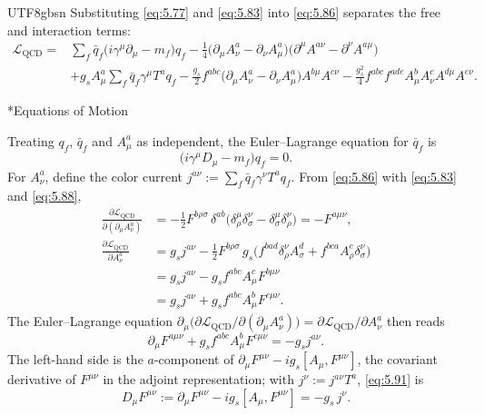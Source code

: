 \documentclass[11pt,a4paper,oneside]{report}
\makeatletter
\newcommand\topic{\@startsection{paragraph}{4}{\z@}{-1.7ex plus -.3ex}{.5ex}{\normalfont\normalsize\bfseries\itshape\boldmath}*}
\makeatother
\begin{document}
\begin{CJK*}{UTF8}{gbsn}
Substituting \eqref{eq:5.77} and \eqref{eq:5.83} into \eqref{eq:5.86} separates the free and interaction terms:
\begin{equation*}
\begin{aligned}
\mathcal L_{\mathrm{QCD}}
={}&\sum_f\bar q_f\bigl(i\gamma^\mu\partial_\mu-m_f\bigr)q_f
-\frac14\bigl(\partial_\mu A^a_\nu-\partial_\nu A^a_\mu\bigr)\bigl(\partial^\mu A^{a\nu}-\partial^\nu A^{a\mu}\bigr)\\[6pt]
&+g_sA^a_\mu\sum_f\bar q_f\gamma^\mu T^aq_f
-\frac{g_s}{2}f^{abc}\bigl(\partial_\mu A^a_\nu-\partial_\nu A^a_\mu\bigr)A^{b\mu}A^{c\nu}
-\frac{g_s^2}{4}f^{abc}f^{ade}A^b_\mu A^c_\nu A^{d\mu}A^{e\nu}.
\end{aligned}
\tag{5.88}\label{eq:5.88}
\end{equation*}

\topic{Equations of Motion}

Treating $q_f$, $\bar q_f$ and $A^a_\mu$ as independent, the Euler–Lagrange equation for $\bar q_f$ is
\begin{equation*}
\bigl(i\gamma^\mu D_\mu-m_f\bigr)q_f=0.
\tag{5.89}\label{eq:5.89}
\end{equation*}
For $A^a_\nu$, define the color current $j^{a\nu}:=\sum_f\bar q_f\gamma^\nu T^aq_f$. From \eqref{eq:5.86} with \eqref{eq:5.83} and \eqref{eq:5.88},
\begin{equation*}
\begin{aligned}
\frac{\partial\mathcal L_{\mathrm{QCD}}}{\partial(\partial_\mu A^a_\nu)}
&=-\frac12F^{b\rho\sigma}\,\delta^{ab}\bigl(\delta^\mu_\rho\delta^\nu_\sigma-\delta^\mu_\sigma\delta^\nu_\rho\bigr)
=-F^{a\mu\nu},\\[6pt]
\frac{\partial\mathcal L_{\mathrm{QCD}}}{\partial A^a_\nu}
&=g_sj^{a\nu}-\frac12F^{b\rho\sigma}\,g_s\bigl(f^{bad}\delta^\nu_\rho A^d_\sigma+f^{bca}A^c_\rho\delta^\nu_\sigma\bigr)\\
&=g_sj^{a\nu}-g_sf^{abc}A^c_\mu F^{b\mu\nu}\\
&=g_sj^{a\nu}+g_sf^{abc}A^b_\mu F^{c\mu\nu}.
\end{aligned}
\tag{5.90}\label{eq:5.90}
\end{equation*}
The Euler–Lagrange equation $\partial_\mu\bigl(\partial\mathcal L_{\mathrm{QCD}}/\partial(\partial_\mu A^a_\nu)\bigr)=\partial\mathcal L_{\mathrm{QCD}}/\partial A^a_\nu$ then reads
\begin{equation*}
{\displaystyle 
\partial_\mu F^{a\mu\nu}+g_sf^{abc}A^b_\mu F^{c\mu\nu}=-g_sj^{a\nu}.
}
\tag{5.91}\label{eq:5.91}
\end{equation*}
The left-hand side is the $a$-component of $\partial_\mu F^{\mu\nu}-ig_s[A_\mu,F^{\mu\nu}]$, the covariant derivative of $F^{\mu\nu}$ in the adjoint representation; with $j^\nu:=j^{a\nu}T^a$, \eqref{eq:5.91} is
\begin{equation*}
D_\mu F^{\mu\nu}:=\partial_\mu F^{\mu\nu}-ig_s[A_\mu,F^{\mu\nu}]=-g_s\,j^\nu.
\tag{5.92}\label{eq:5.92}
\end{equation*}


\end{CJK*}
\end{document}
